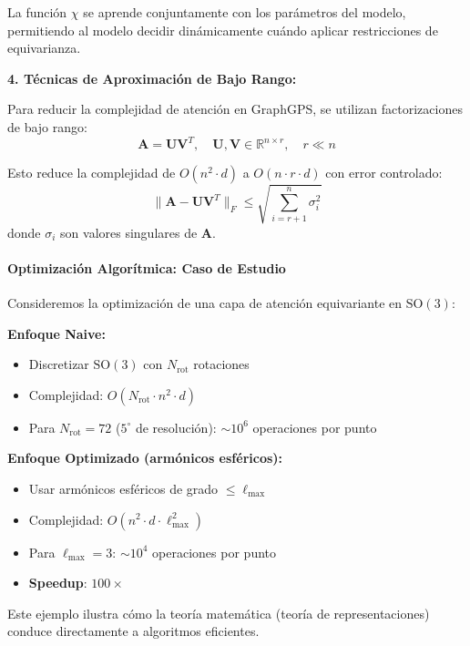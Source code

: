 La función $\chi$ se aprende conjuntamente con los parámetros del modelo, permitiendo al modelo decidir dinámicamente cuándo aplicar restricciones de equivarianza.

\textbf{4. Técnicas de Aproximación de Bajo Rango:}

Para reducir la complejidad de atención en GraphGPS, se utilizan factorizaciones de bajo rango:
\begin{equation}
\mathbf{A} = \mathbf{U} \mathbf{V}^T, \quad \mathbf{U}, \mathbf{V} \in \mathbb{R}^{n \times r}, \quad r \ll n
\end{equation}

Esto reduce la complejidad de $O(n^2 \cdot d)$ a $O(n \cdot r \cdot d)$ con error controlado:
\begin{equation}
\|\mathbf{A} - \mathbf{U}\mathbf{V}^T\|_F \leq \sqrt{\sum_{i=r+1}^n \sigma_i^2}
\end{equation}
donde $\sigma_i$ son valores singulares de $\mathbf{A}$.

\paragraph{Optimización Algorítmica: Caso de Estudio}

Consideremos la optimización de una capa de atención equivariante en $\text{SO}(3)$:

\textbf{Enfoque Naive:}
\begin{itemize}
\item Discretizar $\text{SO}(3)$ con $N_{\text{rot}}$ rotaciones
\item Complejidad: $O(N_{\text{rot}} \cdot n^2 \cdot d)$
\item Para $N_{\text{rot}} = 72$ ($5^\circ$ de resolución): $\sim 10^6$ operaciones por punto
\end{itemize}

\textbf{Enfoque Optimizado (armónicos esféricos):}
\begin{itemize}
\item Usar armónicos esféricos de grado $\leq \ell_{\max}$
\item Complejidad: $O(n^2 \cdot d \cdot \ell_{\max}^2)$
\item Para $\ell_{\max} = 3$: $\sim 10^4$ operaciones por punto
\item \textbf{Speedup}: $100\times$
\end{itemize}

Este ejemplo ilustra cómo la teoría matemática (teoría de representaciones) conduce directamente a algoritmos eficientes.

